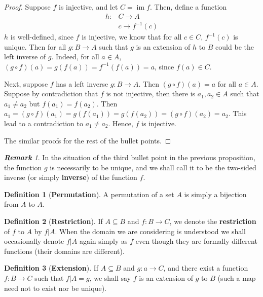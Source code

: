 \documentclass[paper=a4, fontsize=11pt]{scrartcl}
\numberwithin{equation}{section}		%
\numberwithin{figure}{section}			%
\numberwithin{table}{section}				%
\newcommand{\im}{\ensuremath{\operatorname{im}}}
\renewcommand{\to}{\ensuremath{\rightarrow}}
\theoremstyle{definition}
\newtheorem{definition}{Definition}[section]
\theoremstyle{remark}
\newtheorem*{remark}{\textbf{Remark}}
\theoremstyle{example}
\begin{document}
\begin{proof}
    Suppose $f$ is injective, and let $C = \im f$. Then, define a function 
    \begin{equation}
        \begin{aligned}
            h: &C \to A\\
            &c \to f^{-1}(c)
        \end{aligned}
    \end{equation}
    $h$ is well-defined, since $f$ is injective, we know that for all $c \in C$, $f^{-1}(c)$ is unique. Then for all $g: B \to A$ such that $g$ is an extension of $h$ to $B$ could be the left inverse of $g$. Indeed, for all $a \in A$, $(g \circ f)(a) = g(f(a)) = f^{-1}(f(a)) = a$, since $f(a) \in C$. 
    
    Next, suppose $f$ has a left inverse $g: B \to A$. Then $(g \circ f)(a) = a$ for all $a \in A$. Suppose by contradiction that $f$ is not injective, then there is $a_1, a_2 \in A$ such that $a_1 \neq a_2$ but $f(a_1) = f(a_2)$. Then $a_1 = (g \circ f)(a_1) = g(f(a_1)) = g(f(a_2)) = (g \circ f)(a_2) = a_2$. This lead to a contradiction to $a_1 \neq a_2$. Hence, $f$ is injective.
    
    The similar proofs for the rest of the bullet points.
\end{proof}

\begin{remark}
    In the situation of the third bullet point in the previous proposition, the function $g$ is necessarily to be unique, and we shall call it to be the two-sided inverse (or simply \textbf{inverse}) of the function $f$.
\end{remark}

\begin{definition}[\textbf{Permutation}]
    A permutation of a set $A$ is simply a bijection from $A$ to $A$.
\end{definition}

\begin{definition}[\textbf{Restriction}]
    If $A \subseteq B$ and $f: B \to C$, we denote the \textbf{restriction} of $f$ to $A$ by $f\lvert A$. When the domain we are considering is understood we shall occasionally denote $f \lvert A$ again simply as $f$ even though they are formally different functions (their domains are different).
\end{definition}

\begin{definition}[\textbf{Extension}]
    If $A \subseteq B$ and $g: a \to C$, and there exist a function $f: B \to C$ such that $f\lvert A = g$, we shall say $f$ is an extension of $g$ to $B$ (such a map need not to exist nor be unique).
\end{definition}
\end{document}
